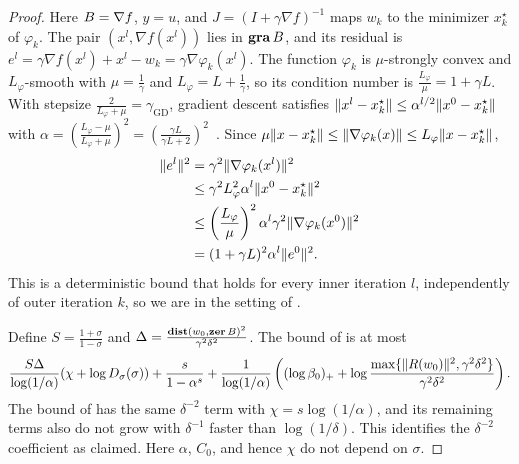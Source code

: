 \documentclass[11pt]{article}
\begin{document}
\begin{proof}
    Here ${B} = \nabla f$, $y = u$, and $J = (I+\gamma\nabla f)^{-1}$ maps $w_k$ to the minimizer $x_k^\star$ of $\varphi_k$.
    The pair $(x^l,\nabla f(x^l))$ lies in $\mathop{\bf gra} {B}$, and its residual is $e^l = \gamma\nabla f(x^l) + x^l - w_k = \gamma\nabla\varphi_k(x^l)$.
    The function $\varphi_k$ is $\mu$-strongly convex and $L_\varphi$-smooth with $\mu = \frac{1}{\gamma}$ and $L_\varphi = L + \frac{1}{\gamma}$, so its condition number is $\frac{L_\varphi}{\mu} = 1 + \gamma L$.
    With stepsize $\frac{2}{L_\varphi+\mu} = \gamma_{\mathrm{GD}}$, gradient descent satisfies $\lVert x^l - x_k^\star\rVert\leq \alpha^{l/2}\lVert x^0 - x_k^\star\rVert$ with ${\alpha} = \left( \frac{L_\varphi - \mu}{L_\varphi + \mu} \right)^2 = \left( \frac{\gamma L}{\gamma L + 2} \right)^2$~\citep[Theorem 2.1.15]{nesterov2004introductory}.
    Since $\mu\lVert x - x_k^\star\rVert\leq\lVert\nabla\varphi_k(x)\rVert\leq L_\varphi\lVert x - x_k^\star\rVert$,
    \begin{align}
        \lVert e^l\rVert^2 &= \gamma^2\lVert\nabla\varphi_k(x^l)\rVert^2 \\
        &\leq \gamma^2L_\varphi^2\alpha^{l}\lVert x^0 - x_k^\star\rVert^2 \\
        &\leq \left(\frac{L_\varphi}{\mu}\right)^2\alpha^{l}\gamma^2\lVert\nabla\varphi_k(x^0)\rVert^2 \\
        &= (1+\gamma L)^2\alpha^{l}\lVert e^0\rVert^2.
    \end{align}
    This is a deterministic bound that holds for every inner iteration $l$, independently of outer iteration $k$, so we are in the setting of .

    Define $S = \frac{1+\sigma}{1-\sigma}$ and $\Delta = \frac{\mathop{\bf dist{}}(w_0,\mathop{\bf zer} {B})^2}{\gamma^2\delta^2}$.
    The bound of  is at most
    \begin{align}
        \frac{S\Delta}{\log(1/\alpha)}(\chi +  \log D_{\sigma} (\sigma)) + \frac{s}{1-\alpha^s} + \frac{1}{\log(1/\alpha)}\left( (\log\beta_0)_+  + \log\frac{\max\{\lVert R(w_0)\rVert^2,\gamma^2\delta^2\}}{\gamma^2\delta^2}\right).
    \end{align}
    The bound of  has the same $\delta^{-2}$ term with $\chi = s\log(1/\alpha)$, and its remaining terms also do not grow with $\delta^{-1}$ faster than $\log(1/\delta)$.
    This identifies the $\delta^{-2}$ coefficient as claimed.
    Here $\alpha$, $C_0$, and hence $\chi$ do not depend on $\sigma$.


\end{proof}
\end{document}
